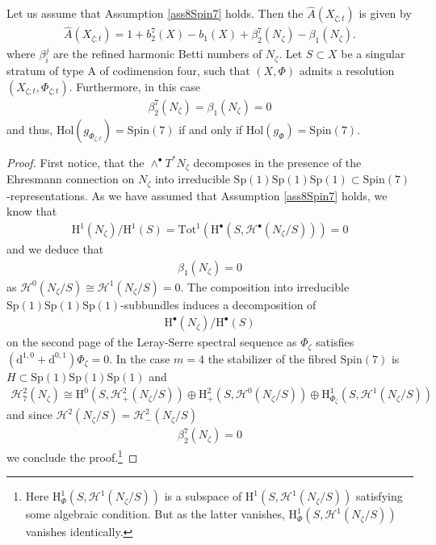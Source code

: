 \documentclass[psamsfonts]{amsart}
\theoremstyle{plain}
\theoremstyle{definition}{
\newtheorem{defi}{Definition}[section]
\newtheorem{ass}{Assumption}
\newtheorem*{nota}{Notation}}
\theoremstyle{remark}{
\newtheorem{rem}{Remark}
\newtheorem{ex}{Example}}
\theoremstyle{plain}{
\newtheorem{thm}{Theorem}[section]
\newtheorem{lem}{Lemma}[section]
\newtheorem{cor}{Corollary}[section]
\newtheorem{prop}{Proposition}[section]
\newtheorem{con}{Conjecture}[section]}
\newcommand{\m}[1]{{\mathrm{#1}}}
\newcommand{\tot}[3]{\underset{#1}{\m{Tot}^{#2}}\left(#3\right)}
\begin{document}
\begin{prop}
Let us assume that Assumption \ref{ass8Spin7} holds. Then the $\hat{A}(X_{\zeta;t})$ is given by 
\begin{align*}
    \hat{A}(X_{\zeta;t})=1+b^7_2(X)-b_1(X)+\beta^7_2(N_\zeta)-\beta_1(N_\zeta).
\end{align*}
where $\beta^j_i$ are the refined harmonic Betti numbers of $N_\zeta$. Let $S\subset X$ be a singular stratum of type A of codimension four, such that $(X,\Phi)$ admits a resolution $(X_{\zeta;t},\Phi_{\zeta;t})$. Furthermore, in this case 
\begin{align*}
    \beta^7_2(N_\zeta)=\beta_1(N_\zeta)=0
\end{align*}
and thus, $\m{Hol}(g_{\Phi_{\zeta;t}})=\m{Spin}(7)$ if and only if $\m{Hol}(g_\Phi)=\m{Spin}(7)$.
\end{prop}

\begin{proof}
First notice, that the $\wedge^\bullet T^*N_\zeta$ decomposes in the presence of the Ehresmann connection on $N_\zeta$ into irreducible $\m{Sp}(1)\m{Sp}(1)\m{Sp}(1)\subset\m{Spin}(7)$-representations. As we have assumed that Assumption \ref{ass8Spin7} holds, we know that
\begin{align*}
    \m{H}^1(N_\zeta)/\m{H}^1(S)=\tot{}{1}{\m{H}^\bullet(S,\mathcal{H}^\bullet(N_\zeta/S))}=0
\end{align*}
and we deduce that
\begin{align*}
    \beta_1(N_\zeta)=0
\end{align*}
as $\mathcal{H}^0(N_\zeta/S)\cong\mathcal{H}^1(N_\zeta/S)=0$. The composition into irreducible $\m{Sp}(1)\m{Sp}(1)\m{Sp}(1)$-subbundles induces a decomposition of 
\begin{align*}
    \m{H}^\bullet(N_\zeta)/\m{H}^\bullet(S)
\end{align*}
on the second page of the Leray-Serre spectral sequence as $\Phi_{\zeta}$ satisfies $(\m{d}^{1,0}+\m{d}^{0,1})\Phi_\zeta=0$. In the case $m=4$ the stabilizer of the fibred $\m{Spin}(7)$ is $H\subset\m{Sp}(1)\m{Sp}(1)\m{Sp}(1)$ and
\begin{align*}
    \mathcal{H}^2_{7}(N_\zeta)\cong\m{H}^0(S,\mathcal{H}^2_+(N_\zeta/S))\oplus \m{H}^2_+(S,\mathcal{H}^0(N_\zeta/S))\oplus \m{H}^1_{\Phi_\zeta}(S,\mathcal{H}^1(N_\zeta/S))
\end{align*}
and since $\mathcal{H}^2(N_\zeta/S)=\mathcal{H}^2_-(N_\zeta/S)$
\begin{align*}
    \beta^7_2(N_\zeta)=0
\end{align*}
we conclude the proof.\footnote{Here $\m{H}^1_{\Phi}(S,\mathcal{H}^1(N_\zeta/S))$ is a subspace of $\m{H}^1(S,\mathcal{H}^1(N_\zeta/S))$ satisfying some algebraic condition. But as the latter vanishes, $\m{H}^1_{\Phi}(S,\mathcal{H}^1(N_\zeta/S))$ vanishes identically.}
\end{proof}
\end{document}
